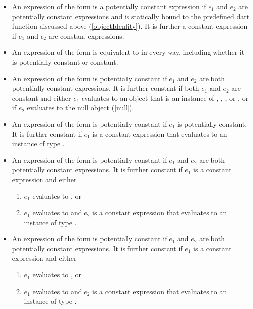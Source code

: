 \documentclass[makeidx]{article}
\begin{document}
{\begin{itemize}
\item An expression of the form  is a potentially constant expression if $e_1$ and $e_2$ are potentially constant expressions and  is statically bound to the predefined dart function  discussed above (\ref{objectIdentity}). It is further a constant expression if $e_1$ and $e_2$ are constant expressions.

\item An expression of the form  is equivalent to  in every way, including whether it is potentially constant or constant.

\item An expression of the form  is potentially constant
  if $e_1$ and $e_2$ are both potentially constant expressions.
  It is further constant if both $e_1$ and $e_2$ are constant and
  either $e_1$ evaluates to an object that is an instance of
  , , ,  or ,
  or if $e_2$ evaluates to the null object (\ref{null}).

\item An expression of the form  is potentially constant if $e_1$ is potentially constant. It is further constant if $e_1$ is a constant expression that evaluates to an instance of type .

\item An expression of the form  is potentially constant if $e_1$ and $e_2$ are both potentially constant expressions. It is further constant if $e_1$ is a constant expression and either
\begin{enumerate}
\item $e_1$ evaluates to \FALSE{}, or
\item $e_1$ evaluates to \TRUE{} and $e_2$ is a constant expression that evaluates to an instance of type .
\end{enumerate}

\item An expression of the form  is potentially constant if $e_1$ and $e_2$ are both potentially constant expressions. It is further constant if $e_1$ is a constant expression and either
\begin{enumerate}
\item $e_1$ evaluates to \TRUE{}, or
\item $e_1$ evaluates to \FALSE{} and $e_2$ is a constant expression that evaluates to an instance of type .
\end{enumerate}


\end{itemize}}
\end{document}

